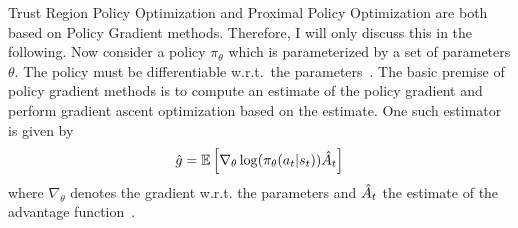 Trust Region Policy Optimization and Proximal Policy Optimization are both based on Policy Gradient methods.
Therefore, I will only discuss this in the following.
Now consider a policy $\pi_\theta$ which is parameterized by a set of parameters $\theta$.
The policy must be differentiable w.r.t.\ the parameters~\cite{Sutton1999}.
The basic premise of policy gradient methods is to compute an estimate of the policy gradient and perform gradient ascent
optimization based on the estimate.
One such estimator is given by
\begin{equation}
    \Hat{g} = \mathbb{E}\left[ \nabla_\theta \log(\pi_\theta(a_t | s_t)) \Hat{A}_t\right]
\end{equation}
where $\nabla_\theta$ denotes the gradient w.r.t. the parameters and $\Hat{A}_t$ the estimate of the advantage function~\cite{schulman2017ppo}.

